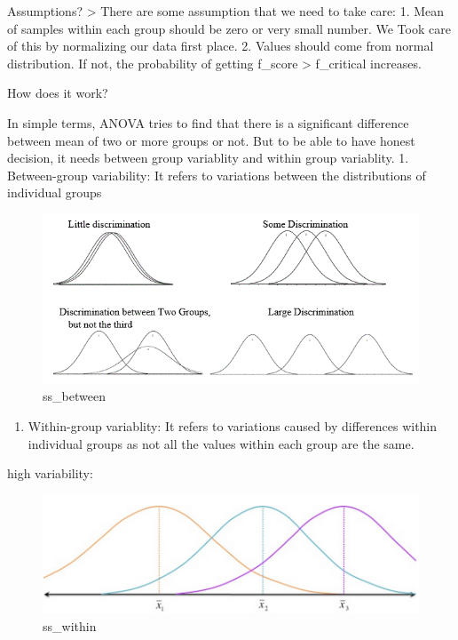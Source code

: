\documentclass[11pt]{article}
\makeatletter
\def\maxwidth{\ifdim\Gin@nat@width>\linewidth\linewidth
    \else\Gin@nat@width\fi}
\let\Oldincludegraphics\includegraphics
\renewcommand{\includegraphics}[1]{\Oldincludegraphics[width=.8\maxwidth]{#1}}
\providecommand{\tightlist}{%
      \setlength{\itemsep}{0pt}\setlength{\parskip}{0pt}}
\makeatother
\begin{document}
Assumptions? \textgreater{} There are some assumption that we need to
take care: 1. Mean of samples within each group should be zero or very
small number. We Took care of this by normalizing our data first place.
2. Values should come from normal distribution. If not, the probability
of getting f\_score \textgreater{} f\_critical increases.

How does it work?

In simple terms, ANOVA tries to find that there is a significant
difference between mean of two or more groups or not. But to be able to
have honest decision, it needs between group variablity and within group
variablity. 1. Between-group variability: It refers to variations
between the distributions of individual groups

\begin{figure}
\centering
\includegraphics{wiki/2.png}
\caption{ss\_between}
\end{figure}

\begin{enumerate}
\def\labelenumi{\arabic{enumi}.}
\setcounter{enumi}{1}
\tightlist
\item
  Within-group variablity: It refers to variations caused by differences
  within individual groups as not all the values within each group are
  the same.
\end{enumerate}

high variability:

\begin{figure}
\centering
\includegraphics{wiki/3.png}
\caption{ss\_within}
\end{figure}
\end{document}
